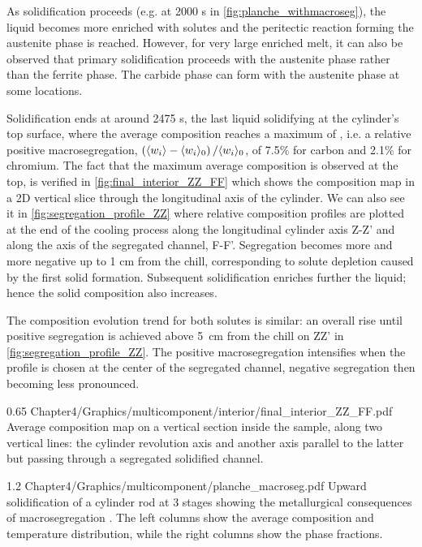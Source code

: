 As solidification proceeds (e.g. at 2000 s in \cref{fig:planche_withmacroseg}), the liquid becomes more enriched with solutes and the peritectic 
reaction forming the austenite phase is reached. However, for very large enriched melt, it can 
also be observed that primary solidification proceeds with the austenite phase rather than the 
ferrite phase. The carbide phase can form with the austenite phase at some locations.

Solidification ends at around \num{2475} s, the last liquid solidifying at the cylinder’s top surface, where the average composition 
reaches a maximum of , i.e. a relative positive macrosegregation, 
$\left( \langle w_i \rangle-\langle w_i \rangle_0 \right)/\langle w_i \rangle_0$, of 7.5\% for carbon and 2.1\% for chromium. The fact that the maximum average 
composition is observed at the top, is verified in \cref{fig:final_interior_ZZ_FF} which shows the composition map in a 2D 
vertical slice through the longitudinal axis of the cylinder. We can also see it in \cref{fig:segregation_profile_ZZ} where 
relative composition profiles are plotted at the end of the cooling process along the longitudinal cylinder 
axis Z-Z’ and along the axis of the segregated channel, F-F’. 
Segregation becomes more and more negative up to 1 cm from the chill, corresponding 
to solute depletion caused by the first solid formation. Subsequent solidification enriches further the 
liquid; hence the solid composition also increases. 

The composition evolution trend for both solutes is similar: 
an overall rise until positive segregation is achieved above \SI{5}{\centi\metre} from the 
chill on ZZ' in \cref{fig:segregation_profile_ZZ}. 
The positive macrosegregation intensifies when the profile is chosen at the center of 
the segregated channel, negative segregation then becoming less pronounced.

\begin{figureth}
{0.65}
{Chapter4/Graphics/multicomponent/interior/final_interior_ZZ_FF.pdf}
{Average composition map on a vertical section inside the sample, along two vertical lines: the cylinder revolution axis
and another axis parallel to the latter but passing through a segregated solidified channel.}
\label{fig:final_interior_ZZ_FF}
\end{figureth}

\begin{landscape}
\begin{figureth}
{1.2}
{Chapter4/Graphics/multicomponent/planche_macroseg.pdf}
{Upward solidification of a cylinder rod  at 3 stages showing the metallurgical consequences 
of macrosegregation . The left columns show the average 
composition and temperature distribution, while the right columns show the phase fractions.}
\label{fig:planche_withmacroseg}
\end{figureth}
\end{landscape}

